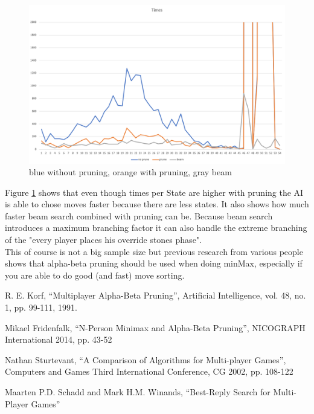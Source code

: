 \documentclass[a4paper,12pt]{article}
\begin{document}
\begin{figure}[h!]
    \centering
    \includegraphics[width = 14cm]{times.png}
    \caption{blue without pruning, orange with pruning, gray beam}
    \label{fig:time}
\end{figure}
Figure \ref{fig:time} shows that even though times per State are higher with pruning the AI is able to chose moves faster because there are less states. It also shows how much faster beam search combined with pruning can be. Because beam search introduces a maximum branching factor it can also handle the extreme branching of the "every player places his override stones phase".\\
This of course is not a big sample size but previous research from various people shows that alpha-beta pruning should be used when doing minMax, especially if you are able to do good (and fast) move sorting.     
\begin{thebibliography}{4}
 R. E. Korf, “Multiplayer Alpha-Beta Pruning”, Artificial Intelligence, vol. 48, no. 1, pp. 99-111, 1991. 

 Mikael Fridenfalk, “N-Person Minimax and Alpha-Beta Pruning”, NICOGRAPH International 2014, pp. 43-52 

 Nathan Sturtevant, “A Comparison of Algorithms for Multi-player Games”, Computers and Games Third International Conference, CG 2002, pp. 108-122

 Maarten P.D. Schadd and Mark H.M. Winands, “Best-Reply Search for Multi-Player Games”
\end{thebibliography}
\end{document}
